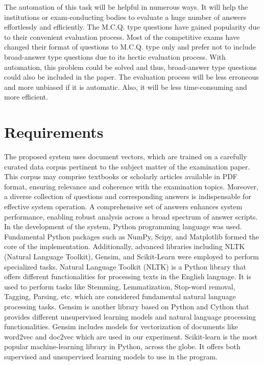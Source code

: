 The automation of this task will be helpful in numerous ways. It will help the institutions or exam-conducting bodies to evaluate a huge number of answers effortlessly and efficiently. The M.C.Q. type questions have gained popularity due to their convenient evaluation process. Most of the competitive exams have changed their format of questions to M.C.Q. type only and prefer not to include broad-answer type questions due to its hectic evaluation process. With automation, this problem could be solved and thus, broad-answer type questions could also be included in the paper. The evaluation process will be less erroneous and more unbiased if it is automatic. Also, it will be less time-consuming and more efficient. 

\section{Requirements}
The proposed system uses document vectors, which are trained on a carefully curated data corpus pertinent to the subject matter of the examination paper. This corpus may comprise textbooks or scholarly articles available in PDF format, ensuring relevance and coherence with the examination topics. Moreover, a diverse collection of questions and corresponding answers is indispensable for effective system operation. A comprehensive set of answers enhances system performance, enabling robust analysis across a broad spectrum of answer scripts. \\

In the development of the system, Python programming language was used. Fundamental Python packages such as NumPy, Scipy, and Matplotlib formed the core of the implementation. Additionally, advanced libraries including NLTK (Natural Language Toolkit), Gensim, and Scikit-Learn were employed to perform specialized tasks. Natural Language Toolkit (NLTK) is a Python library that offers different functionalities for processing texts in the English language. It is used to perform tasks like Stemming, Lemmatization, Stop-word removal, Tagging, Parsing, etc. which are considered fundamental natural language processing tasks. Gensim is another library based on Python and Cython that provides different unsupervised learning models and natural language processing functionalities. Gensim includes models for vectorization of documents like word2vec and doc2vec which are used in our experiment. Scikit-learn is the most popular machine-learning library in Python, across the globe. It offers both supervised and unsupervised learning models to use in the program. \\

